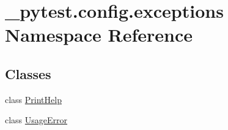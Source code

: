 \hypertarget{namespace__pytest_1_1config_1_1exceptions}{}\section{\+\_\+pytest.\+config.\+exceptions Namespace Reference}
\label{namespace__pytest_1_1config_1_1exceptions}
\subsection*{Classes}
\begin{DoxyCompactItemize}
\item 
class \hyperlink{class__pytest_1_1config_1_1exceptions_1_1_print_help}{Print\+Help}
\item 
class \hyperlink{class__pytest_1_1config_1_1exceptions_1_1_usage_error}{Usage\+Error}
\end{DoxyCompactItemize}
